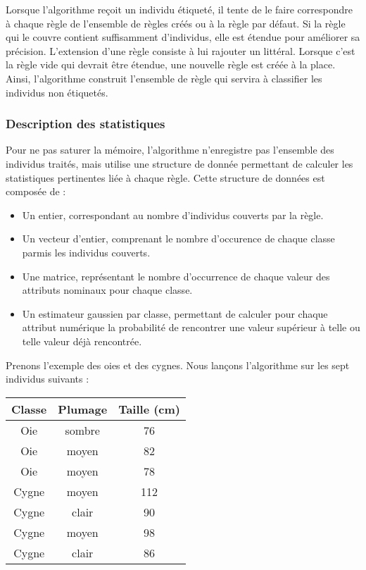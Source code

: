             Lorsque l’algorithme reçoit un individu étiqueté, il tente de le faire correspondre à chaque règle de l’ensemble de règles créés ou à la règle par défaut. Si la règle qui le couvre contient suffisamment d’individus, elle est étendue pour améliorer sa précision. L’extension d’une règle consiste à lui rajouter un littéral. Lorsque c’est la règle vide qui devrait être étendue, une nouvelle règle est créée à la place. Ainsi, l’algorithme construit l’ensemble de règle qui servira à classifier les individus non étiquetés.

        \subsubsection{Description des statistiques}

            Pour ne pas saturer la mémoire, l’algorithme n’enregistre pas l’ensemble des individus traités, mais utilise une structure de donnée permettant de calculer les statistiques pertinentes liée à chaque règle. Cette structure de données est composée de : 
            \begin{itemize}
                \item Un entier, correspondant au nombre d’individus couverts par la règle.
                \item Un vecteur d’entier, comprenant le nombre d’occurence de chaque classe parmis les individus couverts.
                \item Une matrice, représentant le nombre d'occurrence de chaque valeur des attributs nominaux pour chaque classe.
                \item Un estimateur gaussien par classe, permettant de calculer pour chaque attribut numérique la probabilité de rencontrer une valeur supérieur à telle ou telle valeur déjà rencontrée.
            \end{itemize}

            Prenons l’exemple des oies et des cygnes. Nous lançons l'algorithme sur les sept individus suivants :

             \begin{table}[h]\centering
                \begin{tabular}{|ccc|}\hline
                    Classe&Plumage&Taille (cm)\\ \hline
                	Oie & sombre & 76 \\
                	Oie & moyen & 82 \\
                	Oie & moyen & 78 \\
                	Cygne & moyen & 112 \\
                	Cygne & clair & 90 \\
                	Cygne & moyen & 98 \\
                	Cygne & clair & 86 \\ \hline
                \end{tabular}
            \end{table}

